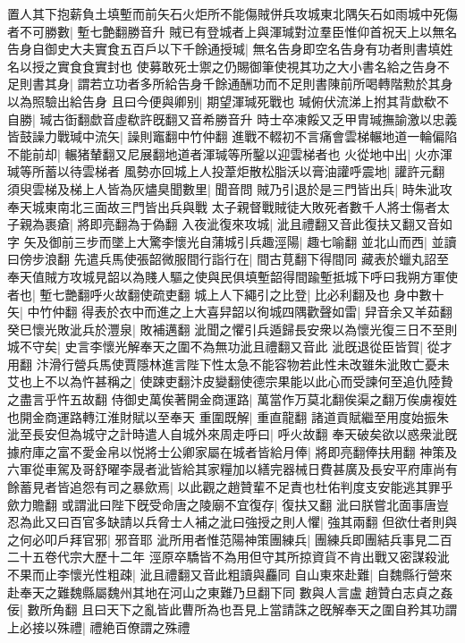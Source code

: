 置人其下抱薪負土填塹而前矢石火炬所不能傷賊併兵攻城東北隅矢石如雨城中死傷者不可勝數|{
	塹七艶翻勝音升}
賊已有登城者上與渾瑊對泣羣臣惟仰首祝天上以無名告身自御史大夫實食五百戶以下千餘通授瑊|{
	無名告身即空名告身有功者則書填姓名以授之實食食實封也}
使募敢死士禦之仍賜御筆使視其功之大小書名給之告身不足則書其身|{
	謂若立功者多所給告身千餘通酬功而不足則書陳前所喝轉階勲於其身以為照驗出給告身}
且曰今便與卿别|{
	期望渾瑊死戰也}
瑊俯伏流涕上拊其背歔欷不自勝|{
	瑊古衘翻歔音虛欷許旣翻又音希勝音升}
時士卒凍餒又乏甲胄瑊撫諭激以忠義皆鼓譟力戰瑊中流矢|{
	譟則竈翻中竹仲翻}
進戰不輟初不言痛會雲梯輾地道一輪偏陷不能前却|{
	輾猪輦翻又尼展翻地道者渾瑊等所鑿以迎雲梯者也}
火從地中出|{
	火亦渾瑊等所蓄以待雲梯者}
風勢亦回城上人投葦炬散松脂沃以膏油讙呼震地|{
	讙許元翻}
須臾雲梯及梯上人皆為灰燼臭聞數里|{
	聞音問}
賊乃引退於是三門皆出兵|{
	時朱泚攻奉天城東南北三面故三門皆出兵與戰}
太子親督戰賊徒大敗死者數千人將士傷者太子親為裹瘡|{
	將即亮翻為于偽翻}
入夜泚復來攻城|{
	泚且禮翻又音此復扶又翻又音如字}
矢及御前三步而墜上大驚李懷光自蒲城引兵趣涇陽|{
	趣七喻翻}
並北山而西|{
	並讀曰傍步浪翻}
先遣兵馬使張韶微服間行詣行在|{
	間古莧翻下得間同}
藏表於蠟丸詔至奉天值賊方攻城見韶以為賤人驅之使與民俱填塹韶得間踰塹抵城下呼曰我朔方軍使者也|{
	塹七艷翻呼火故翻使疏吏翻}
城上人下繩引之比登|{
	比必利翻及也}
身中數十矢|{
	中竹仲翻}
得表於衣中而進之上大喜舁韶以徇城四隅歡聲如雷|{
	舁音余又羊茹翻}
癸巳懷光敗泚兵於灃泉|{
	敗補邁翻}
泚聞之懼引兵遁歸長安衆以為懷光復三日不至則城不守矣|{
	史言李懷光解奉天之圍不為無功泚且禮翻又音此}
泚旣退從臣皆賀|{
	從才用翻}
汴滑行營兵馬使賈隱林進言陛下性太急不能容物若此性未改雖朱泚敗亡憂未艾也上不以為忤甚稱之|{
	使踈吏翻汴皮變翻使德宗果能以此心而受諫何至追仇陸贄之盡言乎忤五故翻}
侍御史萬俟著開金商運路|{
	萬當作万莫北翻俟渠之翻万俟虜複姓也開金商運路轉江淮財賦以至奉天}
重圍既解|{
	重直龍翻}
諸道貢賦繼至用度始振朱泚至長安但為城守之計時遣人自城外來周走呼曰|{
	呼火故翻}
奉天破矣欲以惑衆泚旣據府庫之富不愛金帛以悦將士公卿家屬在城者皆給月俸|{
	將即亮翻俸扶用翻}
神策及六軍從車駕及哥舒曜李晟者泚皆給其家糧加以繕完器械日費甚廣及長安平府庫尚有餘蓄見者皆追怨有司之暴歛焉|{
	以此觀之趙贊輩不足責也杜佑判度支安能逃其罪乎歛力贍翻}
或謂泚曰陛下旣受命唐之陵廟不宜復存|{
	復扶又翻}
泚曰朕嘗北面事唐豈忍為此又曰百官多缺請以兵脅士人補之泚曰強授之則人懼|{
	強其兩翻}
但欲仕者則與之何必叩戶拜官邪|{
	邪音耶}
泚所用者惟范陽神策團練兵|{
	團練兵即團結兵事見二百二十五卷代宗大歷十二年}
涇原卒驕皆不為用但守其所掠資貨不肯出戰又密謀殺泚不果而止李懷光性粗疎|{
	泚且禮翻又音此粗讀與麤同}
自山東來赴難|{
	自魏縣行營來赴奉天之難魏縣屬魏州其地在河山之東難乃旦翻下同}
數與人言盧趙贊白志貞之姦佞|{
	數所角翻}
且曰天下之亂皆此曹所為也吾見上當請誅之旣解奉天之圍自矜其功謂上必接以殊禮|{
	禮絶百僚謂之殊禮}
